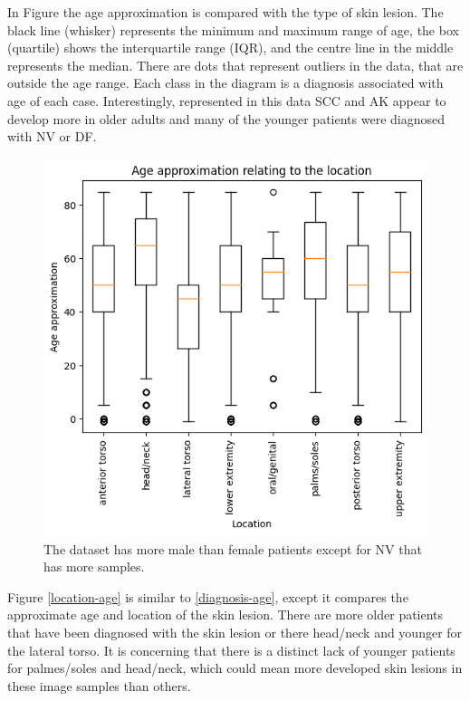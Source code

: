 In Figure \cite{diagnosis-age} the age approximation is compared with the type of skin lesion. The black line (whisker) represents the minimum and maximum range of age, the box (quartile) shows the interquartile range (IQR), and the centre line in the middle represents the median. There are dots that represent outliers in the data, that are outside the age range. Each class in the diagram is a diagnosis associated with age of each case. Interestingly, represented in this data SCC and AK appear to develop more in older adults and many of the younger patients were diagnosed with NV or DF.

\begin{figure}
	\centering
	\includegraphics[]{images/ISIC/location-age.png}
	\caption{The dataset has more male than female patients except for NV that has more samples.} 
\end{figure} \label{location-age}

Figure \ref{location-age} is similar to \ref{diagnosis-age}, except it compares the approximate age and location of the skin lesion. There are more older patients that have been diagnosed with the skin lesion or there head/neck and younger for the lateral torso. It is concerning that there is a distinct lack of younger patients for palmes/soles and head/neck, which could mean more developed skin lesions in these image samples than others.


